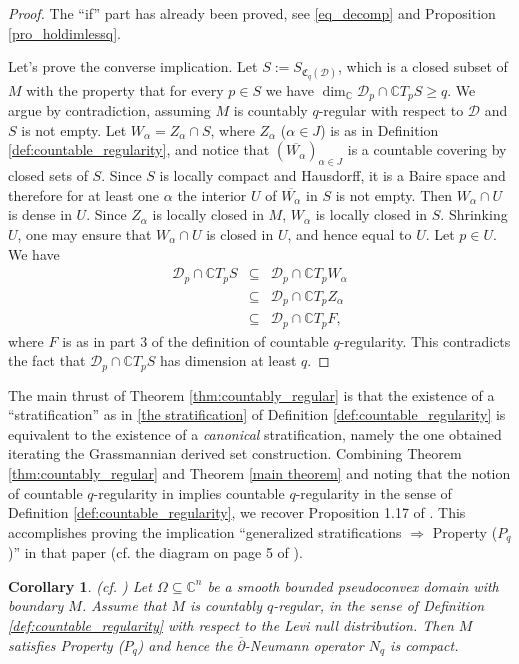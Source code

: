 \documentclass[12pt]{amsart}
\newtheorem{cor}[theorem]{Corollary}
\numberwithin{equation}{section}
{\theoremstyle{definition}
\newtheorem{remark}[theorem]{Remark}
}
\newcommand{\C}{\mathbb{C}}
\begin{document}
\begin{proof} The ``if'' part has already been proved, see \eqref{eq_decomp} and Proposition \ref{pro_holdimlessq}. 

Let's prove the converse implication. Let $S:=S_{\mathfrak{C}_q(\mathcal{D})}$, which is a closed subset of $M$ with the property that for every $p\in S$ we have $\dim_\C\mathcal{D}_p\cap \C T_pS \geq q$. We argue by contradiction, assuming $M$ is countably $q$-regular with respect to $\mathcal{D}$ and $S$ is not empty. Let $W_\alpha=Z_\alpha\cap S$, where $Z_\alpha$ ($\alpha\in J$) is as in Definition \ref{def:countable_regularity}, and notice that $(\overline{W_\alpha})_{\alpha\in J}$ is a countable covering by closed sets of $S$. Since $S$ is locally compact and Hausdorff, it is a Baire space and therefore for at least one $\alpha$ the interior $U$ of $\overline{W_\alpha}$ in $S$ is not empty. Then $W_\alpha\cap U$ is dense in $U$. Since $Z_\alpha$ is locally closed in $M$, $W_\alpha$ is locally closed in $S$. Shrinking $U$, one may ensure that $W_\alpha\cap U$ is closed in $U$, and hence equal to $U$. Let $p\in U$. We have \begin{eqnarray*}\mathcal{D}_p\cap \C T_p S
&\subseteq&\mathcal{D}_p\cap \C T_p W_\alpha\\
&\subseteq&\mathcal{D}_p\cap \C T_p Z_\alpha\\
&\subseteq&\mathcal{D}_p\cap \C T_p F, 
\end{eqnarray*}
where $F$ is as in part 3 of the definition of countable $q$-regularity. This contradicts the fact that $\mathcal{D}_p\cap \C T_pS$ has dimension at least $q$. 
\end{proof}

The main thrust of Theorem \ref{thm:countably_regular} is that the existence of a ``stratification'' as in \eqref{the stratification} of Definition \ref{def:countable_regularity} is equivalent to the existence of a \emph{canonical} stratification, namely the one obtained iterating the Grassmannian derived set construction. Combining Theorem \ref{thm:countably_regular} and Theorem \ref{main theorem} and noting that the notion of countable $q$-regularity in \cite{Za24} implies countable $q$-regularity in the sense of Definition \ref{def:countable_regularity}, we recover Proposition 1.17 of \cite{Za24}.  This accomplishes proving the implication ``generalized stratifications $\Rightarrow$ Property ($P_q$)'' in that paper (cf. the diagram on page 5 of \cite{Za24}).

\begin{cor} (cf. \cite[Proposition 1.17]{Za24})
Let $\Omega\subseteq \C^n$ be a smooth bounded pseudoconvex domain with boundary $M$. Assume that $M$ is countably $q$-regular, in the sense of Definition \ref{def:countable_regularity} with respect to the Levi null distribution. Then $M$ satisfies Property ($P_q$) and hence the $\overline\partial$-Neumann operator $N_q$ is compact. 
\end{cor}
\end{document}

